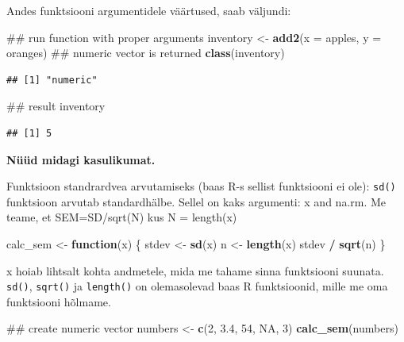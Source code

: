 \documentclass[]{book}
\newenvironment{Shaded}{\begin{snugshade}}{\end{snugshade}}
\newcommand{\KeywordTok}[1]{\textcolor[rgb]{0.13,0.29,0.53}{\textbf{#1}}}
\newcommand{\DataTypeTok}[1]{\textcolor[rgb]{0.13,0.29,0.53}{#1}}
\newcommand{\DecValTok}[1]{\textcolor[rgb]{0.00,0.00,0.81}{#1}}
\newcommand{\FloatTok}[1]{\textcolor[rgb]{0.00,0.00,0.81}{#1}}
\newcommand{\StringTok}[1]{\textcolor[rgb]{0.31,0.60,0.02}{#1}}
\newcommand{\OtherTok}[1]{\textcolor[rgb]{0.56,0.35,0.01}{#1}}
\newcommand{\ControlFlowTok}[1]{\textcolor[rgb]{0.13,0.29,0.53}{\textbf{#1}}}
\newcommand{\OperatorTok}[1]{\textcolor[rgb]{0.81,0.36,0.00}{\textbf{#1}}}
\newcommand{\NormalTok}[1]{#1}
\begin{document}
Andes funktsiooni argumentidele väärtused, saab väljundi:

\begin{Shaded}
\begin{Highlighting}[]
\NormalTok{## run function with proper arguments}
\NormalTok{inventory <-}\StringTok{ }\KeywordTok{add2}\NormalTok{(}\DataTypeTok{x =}\NormalTok{ apples, }\DataTypeTok{y =}\NormalTok{ oranges)}
\NormalTok{## numeric vector is returned}
\KeywordTok{class}\NormalTok{(inventory)}
\end{Highlighting}
\end{Shaded}

\begin{verbatim}
## [1] "numeric"
\end{verbatim}

\begin{Shaded}
\begin{Highlighting}[]
\NormalTok{## result}
\NormalTok{inventory}
\end{Highlighting}
\end{Shaded}

\begin{verbatim}
## [1] 5
\end{verbatim}

\textbf{Nüüd midagi kasulikumat.}

Funktsioon standrardvea arvutamiseks (baas R-s sellist funktsiooni ei
ole): \texttt{sd()} funktsioon arvutab standardhälbe. Sellel on kaks
argumenti: x and na.rm. Me teame, et SEM=SD/sqrt(N) kus N = length(x)

\begin{Shaded}
\begin{Highlighting}[]
\NormalTok{calc_sem <-}\StringTok{ }\ControlFlowTok{function}\NormalTok{(x) \{}
\NormalTok{  stdev <-}\StringTok{ }\KeywordTok{sd}\NormalTok{(x)}
\NormalTok{  n <-}\StringTok{ }\KeywordTok{length}\NormalTok{(x)}
\NormalTok{  stdev }\OperatorTok{/}\StringTok{ }\KeywordTok{sqrt}\NormalTok{(n)}
\NormalTok{\}}
\end{Highlighting}
\end{Shaded}

x hoiab lihtsalt kohta andmetele, mida me tahame sinna funktsiooni
suunata. \texttt{sd()}, \texttt{sqrt()} ja \texttt{length()} on
olemasolevad baas R funktsioonid, mille me oma funktsiooni hõlmame.

\begin{Shaded}
\begin{Highlighting}[]
\NormalTok{## create numeric vector}
\NormalTok{numbers <-}\StringTok{ }\KeywordTok{c}\NormalTok{(}\DecValTok{2}\NormalTok{, }\FloatTok{3.4}\NormalTok{, }\DecValTok{54}\NormalTok{, }\OtherTok{NA}\NormalTok{, }\DecValTok{3}\NormalTok{)}
\KeywordTok{calc_sem}\NormalTok{(numbers)}
\end{Highlighting}
\end{Shaded}
\end{document}

